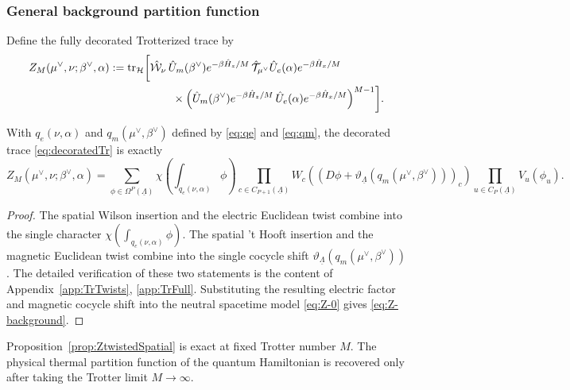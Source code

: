 \subsubsection{General background partition function}
\label{sec:general-background-partition}

Define the fully decorated Trotterized trace by
\begin{equation}
	\begin{aligned}
		Z_M(\mu^\vee,\nu;\beta^\vee,\alpha)
		:=
		\mathrm{tr}_{\mathcal H}\biggl[
		&\hat{\mathcal W}_\nu\,
		\hat U_m(\beta^\vee)e^{-\beta\hat H_z/M}\,
		\hat{\mathcal T}_{\mu^\vee}\hat U_e(\alpha)e^{-\beta\hat H_x/M}
		\\
		&\qquad\times
		\left(
		\hat U_m(\beta^\vee)e^{-\beta\hat H_z/M}\,
		\hat U_e(\alpha)e^{-\beta\hat H_x/M}
		\right)^{M-1}
		\biggr].
	\end{aligned}
	\label{eq:decoratedTr}
\end{equation}

\begin{prop}
	\label{prop:ZtwistedSpatial}
	With \(q_e(\nu,\alpha)\) and \(q_m(\mu^\vee,\beta^\vee)\) defined by
	\eqref{eq:qe} and \eqref{eq:qm}, the decorated
	trace \eqref{eq:decoratedTr} is exactly
	\begin{equation}
		Z_M(\mu^\vee,\nu;\beta^\vee,\alpha)
		=
		\sum_{\phi\in\Omega^P(\underline\Lambda)}
		\chi\left(\int_{q_e(\nu,\alpha)}\phi\right)
		\prod_{c\in C_{P+1}(\underline\Lambda)}
		W_c\left(
		(D\phi+\vartheta_{\underline\Lambda}(q_m(\mu^\vee,\beta^\vee)))_c
		\right)
		\prod_{u\in C_P(\underline\Lambda)}
		V_u(\phi_u).
		\label{eq:Z-background}
	\end{equation}
\end{prop}

\begin{proof}
	The spatial Wilson insertion and the electric Euclidean twist combine into the single
	character $\chi\left(\int_{q_e(\nu,\alpha)}\phi\right)$.
	The spatial 't Hooft insertion and the magnetic Euclidean twist combine into the single
	cocycle shift $\vartheta_{\underline\Lambda}(q_m(\mu^\vee,\beta^\vee))$.
	The detailed verification of these two statements is the content of
	Appendix~\ref{app:TrTwists}, \ref{app:TrFull}. Substituting the resulting electric factor and
	magnetic cocycle shift into the neutral spacetime model
	\eqref{eq:Z-0} gives \eqref{eq:Z-background}.
\end{proof}


Proposition~\ref{prop:ZtwistedSpatial} is exact at fixed Trotter number \(M\). The physical thermal partition function of the quantum Hamiltonian is recovered only after taking the Trotter limit \(M\to\infty\).

